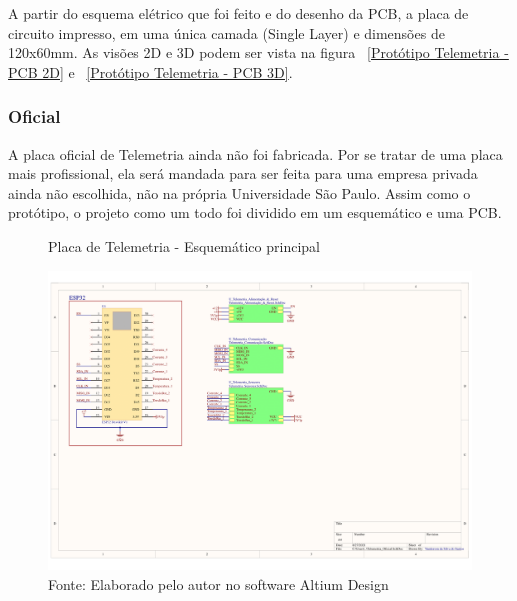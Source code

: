 \documentclass[../delivery_hospital_report.tex]{subfiles}
\begin{document}
A partir do esquema elétrico que foi feito e do desenho da PCB, a placa de circuito impresso, em uma única camada (Single Layer) e dimensões de 120x60mm. As visões 2D e 3D podem ser vista na figura ~\ref{Protótipo Telemetria - PCB 2D} e ~\ref{Protótipo Telemetria - PCB 3D}.

\clearpage

\subsubsection{Oficial}

A placa oficial de Telemetria ainda não foi fabricada. Por se tratar de uma placa mais profissional, ela será mandada para ser feita para uma empresa privada ainda não escolhida, não na própria Universidade São Paulo. Assim como o protótipo, o projeto como um todo foi dividido em um esquemático e uma PCB.

\begin{figure}[!h]
\centering
    \caption{Placa de Telemetria - Esquemático principal }
    \centering %
    \includegraphics[width=17cm]{modulos/Telemetria_Oficial-1.png}
    \caption*{Fonte: Elaborado pelo autor no software Altium Design\cite{altium21} }
    \label{Protótipo placa de ## - Esquemático principal}
\end{figure}
\end{document}
